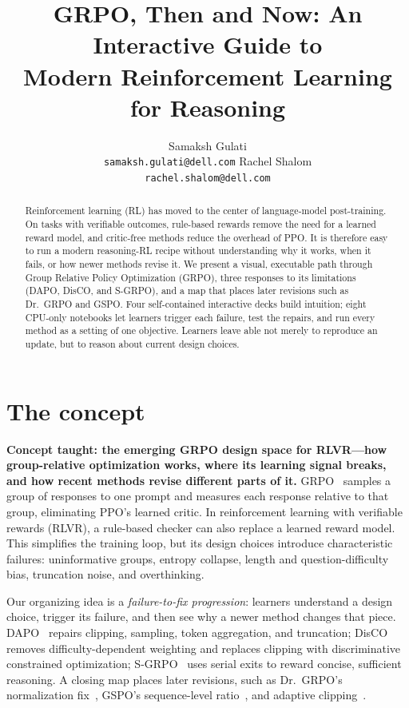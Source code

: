 \documentclass{article}
\title{GRPO, Then and Now: An Interactive Guide to\\Modern Reinforcement Learning for Reasoning}
\author{
  Samaksh Gulati \\
  \texttt{samaksh.gulati@dell.com}
  \And
  Rachel Shalom \\
  \texttt{rachel.shalom@dell.com}
}
\begin{document}
\maketitle

\begin{abstract}
Reinforcement learning (RL) has moved to the center of language-model post-training. On tasks with verifiable outcomes, rule-based rewards remove the need for a learned reward model, and critic-free methods reduce the overhead of PPO. It is therefore easy to run a modern reasoning-RL recipe without understanding why it works, when it fails, or how newer methods revise it. We present a visual, executable path through Group Relative Policy Optimization (GRPO), three responses to its limitations (DAPO, DisCO, and S-GRPO), and a map that places later revisions such as Dr.~GRPO and GSPO. Four self-contained interactive decks build intuition; eight CPU-only notebooks let learners trigger each failure, test the repairs, and run every method as a setting of one objective. Learners leave able not merely to reproduce an update, but to reason about current design choices.
\end{abstract}

\section{The concept}

\textbf{Concept taught: the emerging GRPO design space for RLVR---how group-relative optimization works, where its learning signal breaks, and how recent methods revise different parts of it.}
GRPO~\citep{deepseekmath} samples a group of responses to one prompt and measures each response relative to that group, eliminating PPO's learned critic. In reinforcement learning with verifiable rewards (RLVR), a rule-based checker can also replace a learned reward model. This simplifies the training loop, but its design choices introduce characteristic failures: uninformative groups, entropy collapse, length and question-difficulty bias, truncation noise, and overthinking.

Our organizing idea is a \emph{failure-to-fix progression}: learners understand a design choice, trigger its failure, and then see why a newer method changes that piece. DAPO~\citep{dapo} repairs clipping, sampling, token aggregation, and truncation; DisCO~\citep{disco} removes difficulty-dependent weighting and replaces clipping with discriminative constrained optimization; S-GRPO~\citep{sgrpo} uses serial exits to reward concise, sufficient reasoning. A closing map places later revisions, such as Dr.~GRPO's normalization fix~\citep{drgrpo}, GSPO's sequence-level ratio~\citep{gspo}, and adaptive clipping~\citep{dcpo,bapo}.
\end{document}
